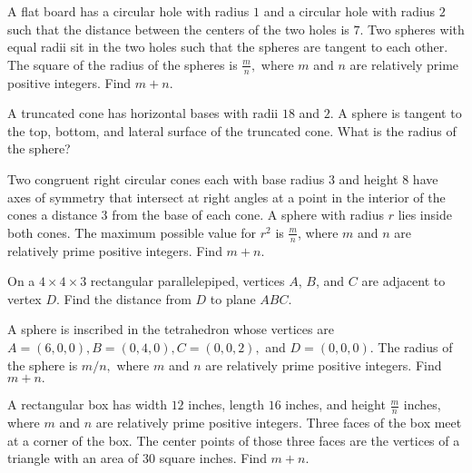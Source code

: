 \documentclass[mast]{lucky}
\begin{document}
\begin{prob}[AIME I 2020/6]{3}
A flat board has a circular hole with radius $1$ and a circular hole with radius $2$ such that the distance between the centers of the two holes is $7.$ Two spheres with equal radii sit in the two holes such that the spheres are tangent to each other. The square of the radius of the spheres is $\tfrac{m}{n},$ where $m$ and $n$ are relatively prime positive integers. Find $m+n.$
\end{prob}

\begin{prob}[AMC 12B 2004/19]{3}
A truncated cone has horizontal bases with radii $18$ and $2$. A sphere is tangent to the top, bottom, and lateral surface of the truncated cone. What is the radius of the sphere?
\end{prob}

\begin{prob}[AIME II 2020/7]{4}
Two congruent right circular cones each with base radius $3$ and height $8$ have axes of symmetry that intersect at right angles at a point in the interior of the cones a distance $3$ from the base of each cone. A sphere with radius $r$ lies inside both cones. The maximum possible value for $r^2$ is $\frac mn$, where $m$ and $n$ are relatively prime positive integers. Find $m+n$.
\end{prob}

\begin{prob}[AHSME 1996/28]{4}
On a $4\times 4\times 3$ rectangular parallelepiped, vertices $A$, $B$, and $C$ are adjacent to vertex $D$. Find the distance from $D$ to plane $ABC$.
\end{prob}


\begin{prob}[AIME I 2001/12]{6}
A sphere is inscribed in the tetrahedron whose vertices are $A = (6,0,0), B = (0,4,0), C = (0,0,2),$ and $D = (0,0,0).$ The radius of the sphere is $m/n,$ where $m$ and $n$ are relatively prime positive integers. Find $m + n.$
\end{prob}

\begin{prob}[AIME I 2013/7]{6}
A rectangular box has width $12$ inches, length $16$ inches, and height $\frac{m}{n}$ inches, where $m$ and $n$ are relatively prime positive integers. Three faces of the box meet at a corner of the box. The center points of those three faces are the vertices of a triangle with an area of $30$ square inches. Find $m+n$.
\end{prob}
\end{document}
